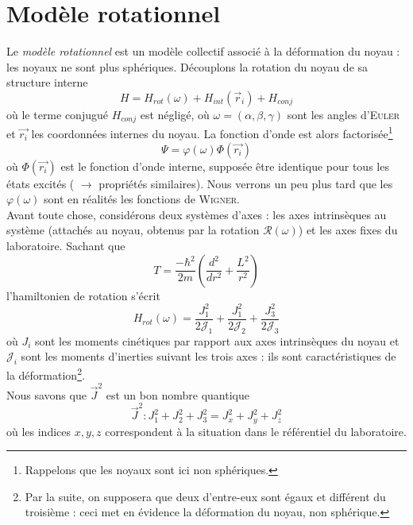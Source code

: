 \section{Modèle rotationnel}
Le \textit{modèle rotationnel} est un modèle collectif associé à la déformation du noyau : les noyaux ne sont
plus sphériques. Découplons la rotation du noyau de sa structure interne
\begin{equation}
H = H_{rot}(\omega) + H_{int}(\vec{r}_i) + H_{conj}
\end{equation}
où le terme conjugué $H_{conj}$ est négligé, où $\omega=(\alpha,\beta,\gamma)$ sont les angles d'\textsc{Euler}
et $\vec{r_i}$ les coordonnées internes du noyau. La fonction d'onde est alors factorisée\footnote{Rappelons
que les noyaux sont ici non sphériques.}
\begin{equation}
\Psi =\varphi(\omega)\Phi(\vec{r_i})
\end{equation}
où $\Phi(\vec{r_i})$ est le fonction d'onde interne, supposée être identique pour tous les états excités (
$\to$ propriétés similaires). Nous verrons un peu plus tard que les $\varphi(\omega)$ sont en réalités les
fonctions de \textsc{Wigner}. \\

Avant toute chose, considérons deux systèmes d'axes : les axes intrinsèques au système (attachés au noyau, 
obtenus par la rotation $\mathcal{R}(\omega)$) et les axes fixes du laboratoire. Sachant que
\begin{equation}
T = \frac{-\hbar^2}{2m}\left( \frac{d^2}{dr^2} + \frac{L^2}{r^2}\right)
\end{equation}
l'hamiltonien de rotation s'écrit
\begin{equation}
H_{rot}(\omega) = \frac{J_1^2}{2\mathcal{J}_1}+\frac{J_1^2}{2\mathcal{J}_2}+\frac{J_3^2}{2\mathcal{J}_3}
\end{equation}
où $J_i$ sont les moments cinétiques par rapport aux axes intrinsèques du noyau et $\mathcal{J}_i$ sont les
moments d'inerties suivant les trois axes : ils sont caractéristiques de la déformation\footnote{Par la suite,
on supposera que deux d'entre-eux sont égaux et différent du troisième : ceci met en évidence la déformation
du noyau, non sphérique.}.\\

Nous savons que $\vec{J}^2$ est un bon nombre quantique
\begin{equation}
\vec{J}^2 : J^2_1+J^2_2+J^2_3=J^2_x+J^2_y+J^2_z
\end{equation}
où les indices $x,y,z$ correspondent à la situation dans le référentiel du laboratoire.\\

